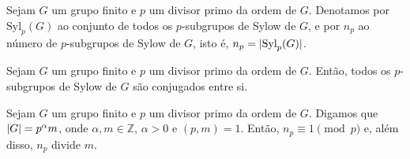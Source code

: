 \begin{definition}
  Sejam $G$ um grupo finito e $p$ um divisor primo da ordem de $G$. Denotamos por $\text{Syl}_{p}(G)$ ao conjunto de todos os $p$-subgrupos de Sylow de $G$, e por $n_{p}$ ao número de $p$-subgrupos de Sylow de $G$, isto é, $n_{p}=\lvert\text{Syl}_{p}(G)\rvert$.
\end{definition}

\begin{theorem}[Sylow]\label{thm:segundo-teorema-de-sylow}
  Sejam $G$ um grupo finito e $p$ um divisor primo da ordem de $G$. Então, todos os $p$-subgrupos de Sylow de $G$ são conjugados entre si.
\end{theorem}

\begin{theorem}[Sylow]\label{thm:terceiro-teorema-de-sylow}
  Sejam $G$ um grupo finito e $p$ um divisor primo da ordem de $G$. Digamos que $\lvert G\rvert=p^{\alpha}m$, onde $\alpha,m\in{\mathbb{Z}}$, $\alpha>0$ e $(p,m)=1$. Então, $n_{p}\equiv{1}\pmod{p}$ e, além disso, $n_{p}$ divide $m$.
\end{theorem}
